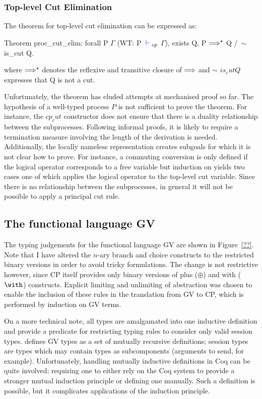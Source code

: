 \subsubsection{Top-level Cut Elimination}

The theorem for top-level cut elimination can be expressed as:
\begin{coq}
Theorem proc_cut_elim:
  forall P $\Gamma$
         (WT: P ${\color{blue} {} \vdash {}}_{cp}$ $\Gamma$),
    exists Q, P $\Longrightarrow^\star$ Q /\ $\sim$ is_cut Q.
\end{coq}

where $\Longrightarrow^\star$ denotes the reflexive and transitive closure of
$\Longrightarrow$ and $\sim$ \coqe$is_cut Q$ expresses that Q is not a cut.

Unfortunately, the theorem has eluded attempts at mechanised proof so far. The
hypothesis of a well-typed process \coqe$P$ is not sufficient to prove the
theorem. For instance, the \coqe$cp_cut$ constructor does not ensure that
there is a duality relationship between the subprocesses. Following informal
proofs, it is likely to require a termination measure involving the length of
the derivation is needed. Additionally, the locally nameless representation
creates subgoals for which it is not clear how to prove. For instance, a
commuting conversion is only defined if the logical operator corresponds to a
free variable but induction on  yields two cases one of which applies
the logical operator to the top-level cut variable. Since there is no
relationship between the subprocesses, in general it will not be possible to
apply a principal cut rule.

\subsection{The functional language GV}\label{sec:gv}

%

The typing judgements for the functional language GV are shown in
Figure~\ref{??}. Note that I have altered the $n$-ary branch and choice
constructs to the restricted binary versions in order to avoid tricky
formulations. The change is not restrictive however, since CP itself provides
only binary versions of plus ($\oplus$) and with ($\with$)
constructs. Explicit limiting and unlimiting of abstraction was chosen to
enable the inclusion of these rules in the translation from GV to CP, which is
performed by induction on GV terms.

On a more technical note, all types are amalgamated into one inductive
definition and provide a predicate for restricting typing rules to consider
only valid session types. \citeauthor{Wadler:2014} defines GV types as a set
of mutually recursive definitions; session types are types which may contain
types as subcomponents (arguments to send, for example). Unfortunately,
handling mutually inductive definitions in Coq can be quite involved;
requiring one to either rely on the Coq system to provide a stronger mutual
induction principle or defining one manually. Such a definition is possible,
but it complicates applications of the induction principle.

